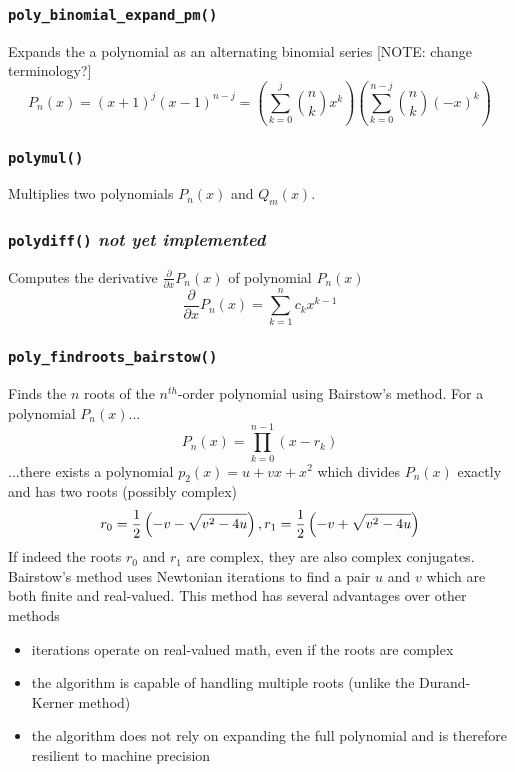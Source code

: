 \subsubsection{{\tt poly\_binomial\_expand\_pm()}}
Expands the a polynomial as an alternating binomial series
[NOTE: change terminology?]
\[
    P_n(x) = (x+1)^j (x-1)^{n-j}
           = \left( \sum_{k=0}^{j}  { {n \choose k}    x^k} \right)
             \left( \sum_{k=0}^{n-j}{ {n \choose k} (-x)^k} \right)
\]

\subsubsection{{\tt polymul()}}
Multiplies two polynomials $P_n(x)$ and $Q_m(x)$.

\subsubsection{{\tt polydiff()} {\it not yet implemented}}
Computes the derivative $\frac{\partial}{\partial x}P_n(x)$ of polynomial
$P_n(x)$
\[
    \frac{\partial}{\partial x}P_n(x) = \sum_{k=1}^{n}{c_{k}x^{k-1}}
\]

\subsubsection{{\tt poly\_findroots\_bairstow()}}
Finds the $n$ roots of the $n^{th}$-order polynomial using Bairstow's method.
For a polynomial $P_n(x)$...
\[
    P_n(x) = \prod_{k=0}^{n-1}{(x-r_k)}
\]
...there exists a polynomial $p_{2}(x)=u + vx + x^2$ which divides
$P_{n}(x)$ exactly and has two roots (possibly complex)
\[
    r_0 = \frac{1}{2}\left(-v-\sqrt{v^2-4u}\right), \; \\
    r_1 = \frac{1}{2}\left(-v+\sqrt{v^2-4u}\right)
\]
If indeed the roots $r_0$ and $r_1$ are complex, they are also complex
conjugates.
Bairstow's method uses Newtonian iterations to find a pair $u$ and $v$ which
are both finite and real-valued.
This method has several advantages over other methods
\begin{itemize}
\item iterations operate on real-valued math, even if the roots are complex
\item the algorithm is capable of handling multiple roots (unlike the
      Durand-Kerner method)
\item the algorithm does not rely on expanding the full polynomial and is
      therefore resilient to machine precision
\end{itemize}



